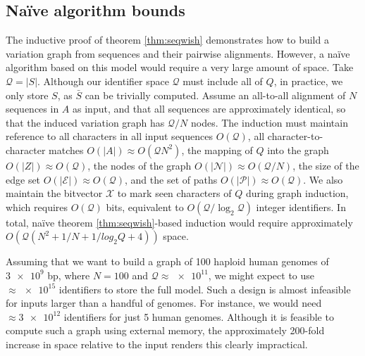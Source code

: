 \documentclass{bioinfo}
\theoremstyle{definition}
\begin{document}

\subsection{Na\"{i}ve algorithm bounds}
\label{sec:bounds}

The inductive proof of theorem \ref{thm:seqwish} demonstrates how to build a variation graph from sequences and their pairwise alignments.
However, a na\"{i}ve algorithm based on this model would require a very large amount of space.
Take $\mathcal{Q} = |S|$.
Although our identifier space $\mathcal{Q}$ must include all of $Q$, in practice, we only store $S$, as $\bar{S}$ can be trivially computed.
Assume an all-to-all alignment of $N$ sequences in $A$ as input, and that all sequences are approximately identical, so that the induced variation graph has $\mathcal{Q}/N$ nodes.
The induction must maintain reference to all characters in all input sequences $O(\mathcal{Q})$, all character-to-character matches $O(|A|) \approx O(\mathcal{Q}N^2)$, the mapping of $Q$ into the graph $O(|Z|) \approx O(\mathcal{Q})$, the nodes of the graph $O(|\mathcal{N}|) \approx O(\mathcal{Q}/N)$, the size of the edge set $O(|\mathcal{E}|) \approx O(\mathcal{Q})$, and the set of paths $O(|\mathcal{P}|) \approx O(\mathcal{Q})$.
We also maintain the bitvector $\mathcal{X}$ to mark seen characters of $Q$ during graph induction, which requires $O(\mathcal{Q})$ bits, equivalent to $O(\mathcal{Q} / \log_2\mathcal{Q})$ integer identifiers.
In total, na\"{i}ve theorem \ref{thm:seqwish}-based induction would require approximately $O(\mathcal{Q}(N^2 + 1/N + 1/log_2{Q} + 4))$ space.

Assuming that we want to build a graph of 100 haploid human genomes of $\num{3e9}$ bp, where $N=100$ and $\mathcal{Q} \approx \num{e11}$, we might expect to use $\approx \num{e15}$ identifiers to store the full model.
Such a design is almost infeasible for inputs larger than a handful of genomes.
For instance, we would need $\approx \num{3e12}$ identifiers for just 5 human genomes.
Although it is feasible to compute such a graph using external memory, the approximately 200-fold increase in space relative to the input renders this clearly impractical.
\end{document}
